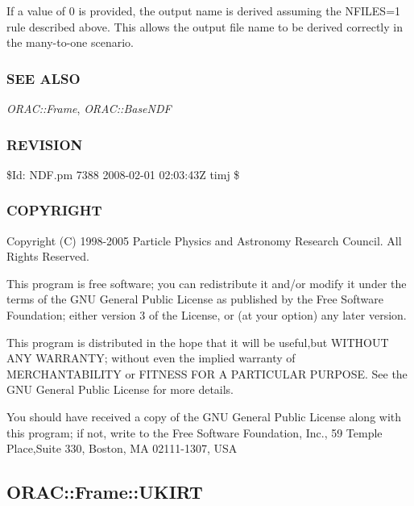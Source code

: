 \begin{description}
\begin{description}
If a value of 0 is provided, the output name is derived assuming the
NFILES=1 rule described above. This allows the output file name
to be derived correctly in the many-to-one scenario.

\end{description}
\subsubsection*{SEE ALSO\label{ORAC::Frame::NDF_SEE_ALSO}}


\emph{ORAC::Frame}, \emph{ORAC::BaseNDF}

\subsubsection*{REVISION\label{ORAC::Frame::NDF_REVISION}}


\$Id: NDF.pm 7388 2008-02-01 02:03:43Z timj \$

\subsubsection*{COPYRIGHT\label{ORAC::Frame::NDF_COPYRIGHT}}


Copyright (C) 1998-2005 Particle Physics and Astronomy Research
Council. All Rights Reserved.



This program is free software; you can redistribute it and/or modify it under
the terms of the GNU General Public License as published by the Free Software
Foundation; either version 3 of the License, or (at your option) any later
version.



This program is distributed in the hope that it will be useful,but WITHOUT ANY
WARRANTY; without even the implied warranty of MERCHANTABILITY or FITNESS FOR A
PARTICULAR PURPOSE. See the GNU General Public License for more details.



You should have received a copy of the GNU General Public License along with
this program; if not, write to the Free Software Foundation, Inc., 59 Temple
Place,Suite 330, Boston, MA  02111-1307, USA

\subsection{ORAC::Frame::UKIRT\label{ORAC::Frame::UKIRT}}



\end{description}
